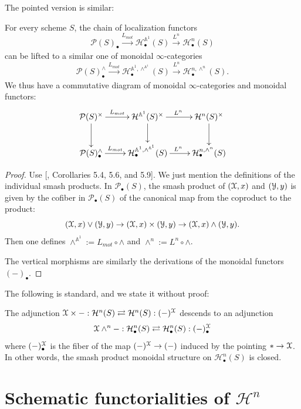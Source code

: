 The pointed version is similar:
\begin{thm}
    For every  scheme $S$, the chain of localization functors $$\mathcal{P}(S)_\bullet\xrightarrow[]{L_{mot}} \mathcal{H}_\bullet^{\mathbb{A}^1}(S)\xrightarrow[]{L^n} \mathcal{H}_\bullet^{n}(S)$$ can be lifted to a similar one of monoidal $\infty$-categories $$\mathcal{P}(S)_\bullet^{\wedge}\xrightarrow[]{L_{mot}} \mathcal{H}_\bullet^{\mathbb{A}^1, \wedge^{\mathbb{A}^1}}(S)\xrightarrow[]{L_{}^{n}} \mathcal{H}_\bullet^{n,\wedge^n} (S).$$ We thus have a commutative diagram of monoidal $\infty$-categories and monoidal functors:
    \[
    \xymatrix{
    \mathcal{P}(S)^{\times}\ar[r]^-{L_{mot}} \ar[d]&\mathcal{H}^{\mathbb{A}^1}(S)^\times\ar[r]^{L^n} \ar[d]&\mathcal{H}^{n}(S)^\times\ar[d]\\
    \mathcal{P}(S)_\bullet^{\wedge}\ar[r]^-{L_{mot
    }} &\mathcal{H}_\bullet^{\mathbb{A}^1, \wedge^{\mathbb{A}^1}}(S)\ar[r]^{L^n} &\mathcal{H}_\bullet^{n,\wedge^n} (S)\\
    }
    \]
\end{thm}
\begin{proof}
    Use [\cite{robalo2012noncommutative}, Corollaries 5.4, 5.6, and 5.9]. We just mention the definitions of the individual smash products. In $\mathcal{P}_\bullet(S)$, the smash product of $(\EuScript{X},x)$ and $(\EuScript{Y},y)$ is given by the cofiber in $\mathcal{P}_\bullet(S)$ of the canonical map from the coproduct to the product:
    $$(\EuScript{X},x)\vee (\EuScript{Y},y)\to (\EuScript{X},x)\times (\EuScript{Y},y)\to (\EuScript{X},x)\wedge (\EuScript{Y},y).$$
    Then one defines $\wedge^{\mathbb{A}^1}:=L_{mot}\circ \wedge$ and $\wedge^n:=L^n\circ \wedge$. 

    The vertical morphisms are similarly the derivations of the monoidal functors $(-)_\bullet$. 
\end{proof}The following is standard, and we state it without proof:
\begin{prop}
    The adjunction $\EuScript{X}\times-:\mathcal{H}^{n}(S)\rightleftarrows\mathcal{H}^{n}(S): (-)^{\EuScript{X}}$ descends to an adjunction $$\EuScript{X}\wedge^n-:\mathcal{H}^{n}_\bullet(S)\rightleftarrows\mathcal{H}^{n}_\bullet(S): (-)_\bullet^{\EuScript{X}}$$ where $(-)_\bullet^{\EuScript{X}}$ is the fiber of the map $(-)^{\EuScript{X}}\to (-)$ induced by the pointing $*\to \EuScript{X}$. In other words, the smash product monoidal structure on $\mathcal{H}^n_\bullet(S)$ is closed.
\end{prop}
\section{Schematic functorialities of \texorpdfstring{$\mathcal{H}^{n}$}{hb} }

